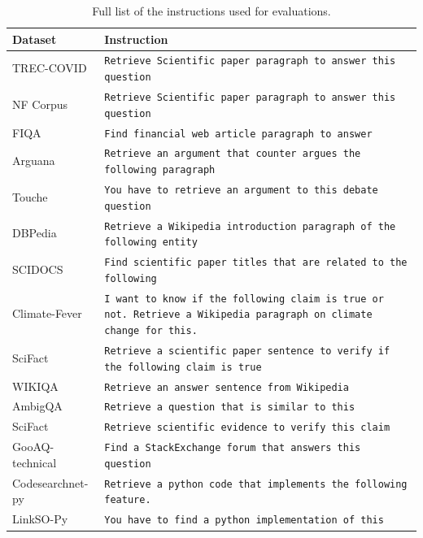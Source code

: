 \begin{table}[t!]
\renewcommand{\arraystretch}{1.2}
\setlength{\tabcolsep}{2pt}
\footnotesize
    \centering
    \begin{tabular}{lp{12cm}}%
\toprule
\textbf{Dataset} & \textbf{Instruction} \\\midrule
TREC-COVID & \texttt{Retrieve Scientific paper paragraph to answer this question} \\
NF Corpus & \texttt{Retrieve Scientific paper paragraph to answer this question} \\
FIQA & \texttt{Find financial web article  paragraph to answer} \\
Arguana & \texttt{Retrieve an argument that counter argues the following paragraph} \\
Touche & \texttt{You have to retrieve an argument to this debate question}  \\
DBPedia & \texttt{Retrieve a Wikipedia introduction paragraph of the following entity}  \\
SCIDOCS & \texttt{Find scientific paper titles that are related to the following} \\
Climate-Fever & \texttt{I want to know if the following claim is true or not. Retrieve a Wikipedia paragraph on climate change for this.} \\
SciFact & \texttt{Retrieve a scientific paper sentence to verify if the following claim is true}\\\hline
WIKIQA & \texttt{Retrieve an answer sentence from Wikipedia} \\
AmbigQA & \texttt{Retrieve a question that is similar to this} \\
SciFact & \texttt{Retrieve scientific evidence to verify this claim} \\
GooAQ-technical & \texttt{Find a StackExchange forum that answers this question} \\
Codesearchnet-py & \texttt{Retrieve a python code that implements the following feature.} \\
LinkSO-Py & \texttt{You have to find a python implementation of this} \\
\bottomrule
 \end{tabular}
    \caption{Full list of the instructions used for evaluations.}\label{tab:list_of_instructions_beir}
\end{table}

